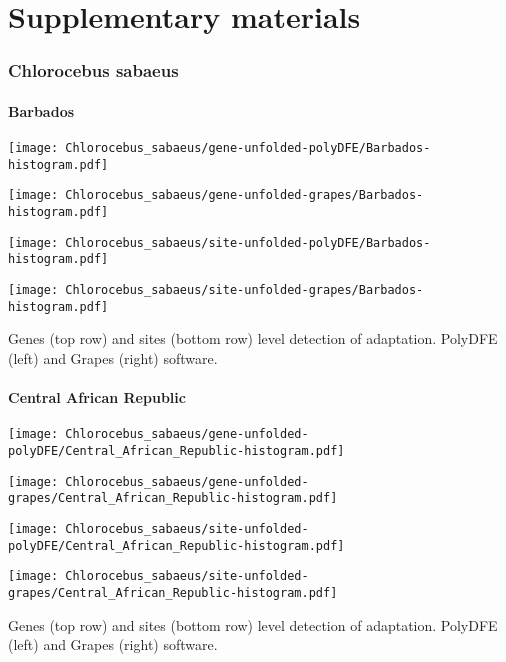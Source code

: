 \documentclass{article}
\begin{document}
\part*{Supplementary materials}
\tableofcontents
 
\pagebreak

\section{Chlorocebus sabaeus}

\subsection{Barbados}
\centering
\begin{minipage}{0.49\linewidth}
    \texttt{[image: Chlorocebus\_sabaeus/gene-unfolded-polyDFE/Barbados-histogram.pdf]}
\end{minipage}%
\hfill
\begin{minipage}{0.49\linewidth}
    \texttt{[image: Chlorocebus\_sabaeus/gene-unfolded-grapes/Barbados-histogram.pdf]}
\end{minipage}
\begin{minipage}{0.49\linewidth}
    \texttt{[image: Chlorocebus\_sabaeus/site-unfolded-polyDFE/Barbados-histogram.pdf]}
\end{minipage}%
\hfill
\begin{minipage}{0.49\linewidth}
    \texttt{[image: Chlorocebus\_sabaeus/site-unfolded-grapes/Barbados-histogram.pdf]}
\end{minipage}
\flushleft
Genes (top row) and sites (bottom row) level detection of adaptation.
PolyDFE (left) and Grapes (right) software.

\subsection{Central African Republic}
\centering
\begin{minipage}{0.49\linewidth}
    \texttt{[image: Chlorocebus\_sabaeus/gene-unfolded-polyDFE/Central\_African\_Republic-histogram.pdf]}
\end{minipage}%
\hfill
\begin{minipage}{0.49\linewidth}
    \texttt{[image: Chlorocebus\_sabaeus/gene-unfolded-grapes/Central\_African\_Republic-histogram.pdf]}
\end{minipage}
\begin{minipage}{0.49\linewidth}
    \texttt{[image: Chlorocebus\_sabaeus/site-unfolded-polyDFE/Central\_African\_Republic-histogram.pdf]}
\end{minipage}%
\hfill
\begin{minipage}{0.49\linewidth}
    \texttt{[image: Chlorocebus\_sabaeus/site-unfolded-grapes/Central\_African\_Republic-histogram.pdf]}
\end{minipage}
\flushleft
Genes (top row) and sites (bottom row) level detection of adaptation.
PolyDFE (left) and Grapes (right) software.
\end{document}

